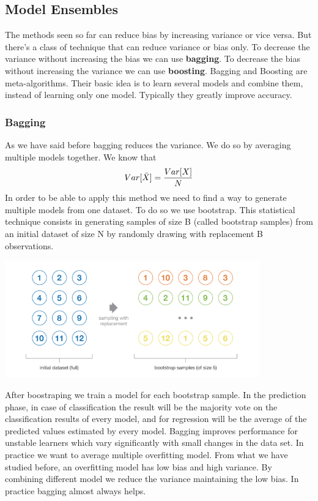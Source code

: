 \documentclass[../main.tex]{subfiles}
\begin{document}
\subsection{Model Ensembles}
The methods seen so far can reduce bias by increasing variance or vice versa. But there's a class of technique that can reduce variance or bias only.
To decrease the variance without increasing the bias we can use \textbf{bagging}.
To decrease the bias without increasing the variance we can use \textbf{boosting}.
Bagging and Boosting are meta-algorithms. Their basic idea is to learn several models and combine them, instead of learning only one model. Typically they greatly improve accuracy.

\subsubsection{Bagging}
As we have said before bagging reduces the variance. We do so by averaging multiple models together. We know that
\begin{equation}
    Var[\Bar{X}] = \frac{Var[X]}{N}
\end{equation}
In order to be able to apply this method we need to find a way to generate multiple models from one dataset. To do so we use bootstrap.
This statistical technique consists in generating samples of size B (called bootstrap samples) from an initial dataset of size N by randomly drawing with replacement B observations.
\begin{center}
    \includegraphics[width=110mm]{images/bootstrap.png}
\end{center}
After boostraping we train a model for each bootstrap sample. In the prediction phase, in case of classification the result will be the majority vote on the classification results of every model, and for regression will be the average of the predicted values estimated by every model. Bagging improves performance for unstable learners which vary significantly with small changes in the data set. In practice we want to average multiple overfitting model. From what we have studied before, an overfitting model has low bias and high variance. By combining different model we reduce the variance maintaining the low bias. In practice bagging almost always helps.
\end{document}
